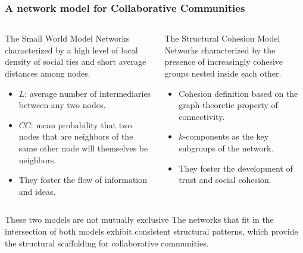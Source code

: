 \documentclass[ignorenonframetext,red,8pt,notes=hide]{beamer}
\begin{document}
\begin{frame}
\frametitle{A network model for Collaborative Communities}

\begin{columns}[c]
\begin{column}{0.5\textwidth}
\begin{block}{The Small World Model}
Networks characterized by a high level of local density of social ties and short average distances among nodes.

\begin{itemize}
\item $L$: average number of intermediaries between any two nodes.
\item $CC$: mean probability that two nodes that are neighbors of the same other node will themselves be neighbors.
\item They foster the flow of information and ideas.

\end{itemize}
\end{block}
\end{column}

\begin{column}{0.5\textwidth}
\begin{block}{The Structural Cohesion Model}
Networks characterized by the presence of increasingly cohesive groups nested inside each other. 
\begin{itemize}
\item Cohesion definition based on the graph-theoretic property of connectivity.
\item $k$-components as the key subgroups of the network.
\item They foster the development of trust and social cohesion.
\end{itemize}
\end{block}
\end{column}

\end{columns}

\pause

\vspace{0.5cm}

\begin{block}{These two models are not mutually exclusive}
The networks that fit in the intersection of both models exhibit consistent structural patterns, which provide the structural scaffolding for collaborative communities. 
\end{block}



\end{frame}
\end{document}
